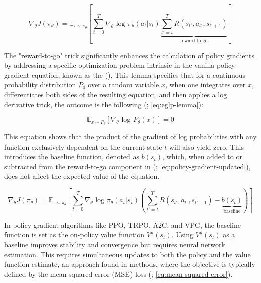 \begin{equation}
    \nabla_{\theta}J(\pi_{\theta}) = \mathbb{E}_{\tau \sim \pi_{\theta}} \left[ \sum_{t=0}^{T} \nabla_{\theta} \text{ log } \pi_{\theta}(a_t | s_t) \underbrace{\sum_{t'= t}^{T} R(s_{t'}, a_{t'}, s_{t'+1})}_{\text{reward-to-go}} \right]
    \label{eq:policy-gradient-updated}
\end{equation}

\noindent The "reward-to-go" trick significantly enhances the calculation of policy gradients by addressing a specific optimization problem intrinsic in the vanilla policy gradient equation, known as the  (\textcolor{deepblue}{\cite{SpinningUp2018}}). This lemma specifies that for a continuous probability distribution $P_0$ over a random variable $x$, when one integrates over $x$, differentiates both sides of the resulting equation, and then applies a log derivative trick, the outcome is the following (\textcolor{deepblue}{\cite{SpinningUp2018}; \autoref{eq:eglp-lemma}}):

\begin{equation}
    \mathbb{E}_{x \sim P_{\theta}} [ \nabla_{\theta} \text{ log } P_{\theta}(x)] = 0
    \label{eq:eglp-lemma}
\end{equation}

\noindent This equation shows that the product of the gradient of log probabilities with any function exclusively dependent on the current state $t$ will also yield zero. This introduces the baseline function, denoted as $b(s_t)$, which, when added to or subtracted from the reward-to-go component in (\textcolor{deepblue}{\cite{SpinningUp2018}; \autoref{eq:policy-gradient-updated}}), does not affect the expected value of the equation.

\begin{equation}
    \nabla_{\theta}J(\pi_{\theta}) = \mathbb{E}_{\tau \sim \pi_{\theta}} \left[ \sum_{t=0}^{T} \nabla_{\theta} \text{ log } \pi_{\theta}(a_t | s_t) \left( \sum_{t'= t}^{T} R(s_{t'}, a_{t'}, s_{t'+1}) - \underbrace{b(s_t)}_{\text{baseline}} \right) \right]
    \label{eq:policy-gradient-baseline}
\end{equation}

\noindent In policy gradient algorithms like PPO, TRPO, A2C, and VPG, the baseline function is set as the on-policy value function $V^{\pi}(s_t)$. Using $V^{\pi}(s_t)$ as a baseline improves stability and convergence but requires neural network estimation. This requires simultaneous updates to both the policy and the value function estimate, an approach found in  methods, where the objective is typically defined by the mean-squared-error (MSE) loss (\textcolor{deepblue}{\cite{SpinningUp2018}; \autoref{eq:mean-squared-error}}).


